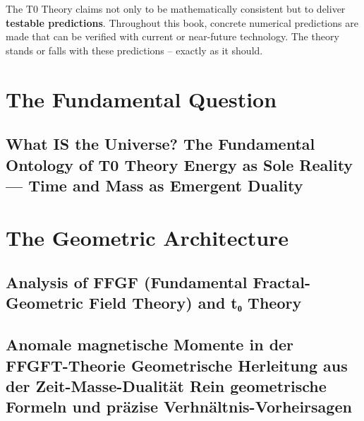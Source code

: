 \documentclass[11pt,oneside]{book}
\begin{document}
\bigskip

The T0 Theory claims not only to be mathematically consistent but to deliver \textbf{testable predictions}. Throughout this book, concrete numerical predictions are made that can be verified with current or near-future technology. The theory stands or falls with these predictions -- exactly as it should.

\tableofcontents

\mainmatter
\pagestyle{fancy}

\part{The Fundamental Question}

\chapter{What IS the Universe? The Fundamental Ontology of T0 Theory Energy as Sole Reality — Time and Mass as Emergent Duality}


\part{The Geometric Architecture}

\chapter{Analysis of FFGF (Fundamental Fractal-Geometric Field Theory) and t₀ Theory}


\chapter{Anomale magnetische Momente in der FFGFT-Theorie Geometrische Herleitung aus der Zeit-Masse-Dualität Rein geometrische Formeln und präzise Verhnältnis-Vorheirsagen}

\end{document}

